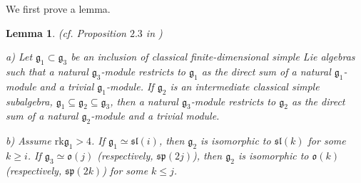 \documentclass{svmult}
\newtheorem{lem}[theo]{Lemma}
\renewcommand{\sp}{\mathfrak{sp}}
\renewcommand{\sl}{\mathfrak{sl}}
\newcommand{\oo}{\mathfrak{o}}
\renewcommand{\gg}{\mathfrak{g}}
\begin{document}
We first prove a lemma.

\begin{lem}\label{lemma:1.4.10}(cf. Proposition $2.3$ in \cite{dip2})

a) Let $\gg_1 \subset \gg_3$ be an inclusion of classical finite-dimensional simple Lie algebras such that a natural $\gg_3$-module restricts to $\gg_1$ as 
the direct sum of a natural $\gg_1$-module and a trivial $\gg_1$-module. If $\gg_2$ is an intermediate classical simple subalgebra, 
$\gg_1\subseteq\gg_2\subseteq\gg_3$, then a natural $\gg_3$-module restricts to $\gg_2$ as the direct sum of a natural $\gg_2$-module and a trivial module. 

b) Assume $\mathrm{rk} \gg_1 > 4$.
If $\gg_1\simeq \sl(i)$, then $\gg_2$ is isomorphic to $\sl(k)$ for some $k\geq i$. If $\gg_3\simeq \oo(j)$   
(respectively, $\sp(2j)$), then $\gg_2$ is isomorphic to $\oo(k)$ (respectively, $\sp(2k)$) for some $k\leq j$.
\end{lem}
\end{document}
